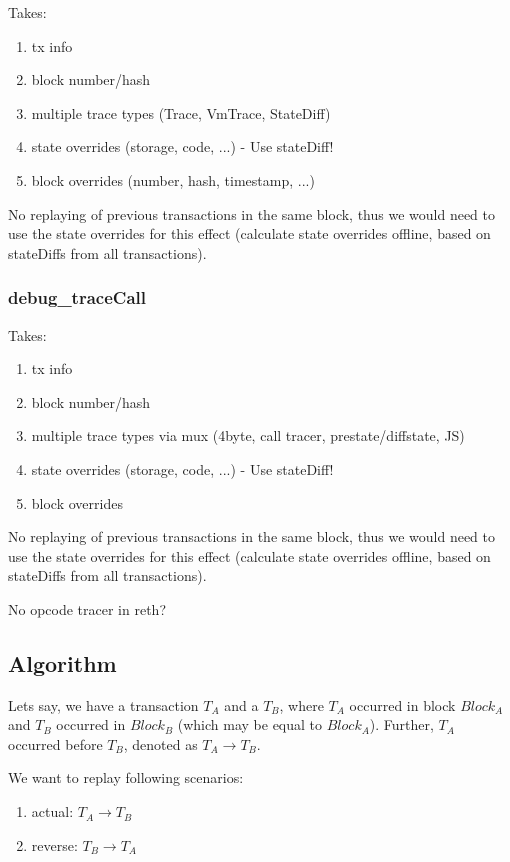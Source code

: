 \documentclass[draft,final]{vutinfth} %
\begin{document}
Takes:
\begin{enumerate}
    \item tx info
    \item block number/hash
    \item multiple trace types (Trace, VmTrace, StateDiff)
    \item state overrides (storage, code, ...) - Use stateDiff!
    \item block overrides (number, hash, timestamp, ...)
\end{enumerate}

No replaying of previous transactions in the same block, thus we would need to use the state overrides for this effect (calculate state overrides offline, based on stateDiffs from all transactions).

\subsubsection{debug\_traceCall}

Takes:
\begin{enumerate}
    \item tx info
    \item block number/hash
    \item multiple trace types via mux (4byte, call tracer, prestate/diffstate, JS)
    \item state overrides (storage, code, ...) - Use stateDiff!
    \item block overrides
\end{enumerate}

No replaying of previous transactions in the same block, thus we would need to use the state overrides for this effect (calculate state overrides offline, based on stateDiffs from all transactions).

No opcode tracer in reth?

\subsection{Algorithm}

Lets say, we have a transaction $T_A$ and a $T_B$, where $T_A$ occurred in block $Block_A$ and $T_B$ occurred in $Block_B$ (which may be equal to $Block_A$). Further, $T_A$ occurred before $T_B$, denoted as $T_A \rightarrow T_B$.

We want to replay following scenarios:

\begin{enumerate}
    \item actual: $T_A \rightarrow T_B$
    \item reverse: $T_B \rightarrow T_A$
\end{enumerate}
\end{document}
